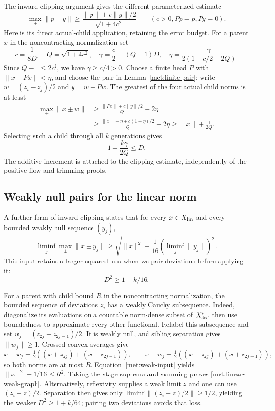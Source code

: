 The inward-clipping argument \cite[Theorem~5.4]{TreePotentials}
gives the different parameterized estimate
\begin{equation}\label{met:linear-clipping-input}
 \max_\pm\|p\pm y\|
 \ge\frac{\|p\|+c\|y\|/2}{\sqrt{1+4c^2}}
 \qquad(c>0, Pp=p, Py=0).
\end{equation}
Here is its direct actual-child application, retaining the error budget.
For a parent $x$ in the noncontracting normalization set
\[
 c=\frac1{8D},\quad Q=\sqrt{1+4c^2},\quad
 \gamma=\frac c2-(Q-1)D,\quad
 \eta=\frac{\gamma}{2(1+c/2+2Q)}.
\]
Since $Q-1\le2c^2$, we have $\gamma\ge c/4>0$.
Choose a finite head $P$ with $\|x-Px\|<\eta$, and choose the pair in
Lemma~\ref{met:finite-pair}; write $w=(z_i-z_j)/2$ and $y=w-Pw$.
The greatest of the four actual child norms is at least
\begin{align*}
 \max_\pm\|x\pm w\|
 &\ge \frac{\|Px\|+c\|y\|/2}{Q}-2\eta\\
 &\ge \frac{\|x\|-\eta+c(1-\eta)/2}{Q}-2\eta
 \ge\|x\|+\frac{\gamma}{2Q}.
\end{align*}
Selecting such a child through all $k$ generations gives
\begin{equation}\label{met:linear-clipping-graph}
 1+\frac{k\gamma}{2Q}\le D.
\end{equation}
The additive increment is attached to the clipping estimate, independently
of the positive-flow and trimming proofs.

\subsection{Weakly null pairs for the linear norm}\label{met:weak-linear}
A further form of inward clipping \cite[Theorem~5.5]{TreePotentials}
states that for every $x\in X_{\rm lin}$
and every bounded weakly null sequence $(y_j)$,
\begin{equation}\label{met:weak-input}
 \liminf_j\max_\pm\|x\pm y_j\|
 \ge\sqrt{\|x\|^2+\frac1{16}(\liminf_j\|y_j\|)^2}.
\end{equation}
This input retains a larger squared loss when we pair deviations before
applying it:
\begin{equation}\label{met:linear-weak-graph}
 D^2\ge1+k/16.
\end{equation}

For a parent with child bound $R$ in the noncontracting normalization,
the bounded sequence of deviations $z_i$ has a weakly Cauchy
subsequence. Indeed, diagonalize its evaluations on a countable
norm-dense subset of $X_{\rm lin}^*$, then use boundedness to
approximate every other functional. Relabel this subsequence and set
$w_j=(z_{2j}-z_{2j-1})/2$. It is weakly null, and sibling separation
gives $\|w_j\|\ge1$. Crossed convex averages give
\[
 x+w_j=\tfrac12((x+z_{2j})+(x-z_{2j-1})),\qquad
 x-w_j=\tfrac12((x-z_{2j})+(x+z_{2j-1})),
\]
so both norms are at most $R$. Equation~\eqref{met:weak-input} yields
$\|x\|^2+1/16\le R^2$. Taking the stage suprema and summing proves
\eqref{met:linear-weak-graph}. Alternatively, reflexivity supplies a
weak limit $z$ and one can use $(z_i-z)/2$. Separation then gives only
$\liminf\|(z_i-z)/2\|\ge1/2$, yielding the weaker
$D^2\ge1+k/64$; pairing two deviations avoids that loss.

